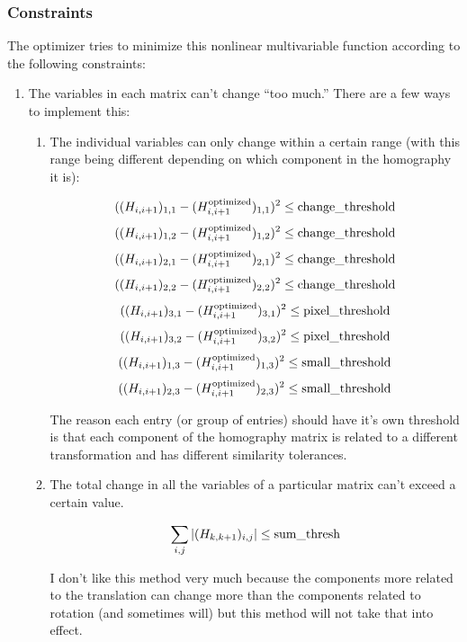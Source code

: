 \documentclass{article}
\begin{document}
\subsubsection{Constraints}

The optimizer tries to minimize this nonlinear multivariable function according
to the following constraints:

\begin{enumerate}

\item The variables in each matrix can't change ``too much.'' There are a few
ways to implement this:

\begin{enumerate}

\item \label{indiv_thresh} The individual variables can only change within a certain range (with
this range being different depending on which component in the homography it
is):

\[((H_{i, i+1})_{1, 1} - (H_{i, i+1}^{\textnormal{optimized}})_{1, 1})^2 \leq \textnormal{change\_threshold}\] 
\[((H_{i, i+1})_{1, 2} - (H_{i, i+1}^{\textnormal{optimized}})_{1, 2})^2 \leq \textnormal{change\_threshold}\] 
\[((H_{i, i+1})_{2, 1} - (H_{i, i+1}^{\textnormal{optimized}})_{2, 1})^2 \leq \textnormal{change\_threshold}\] 
\[((H_{i, i+1})_{2, 2} - (H_{i, i+1}^{\textnormal{optimized}})_{2, 2})^2 \leq \textnormal{change\_threshold}\] 
\[((H_{i, i+1})_{3, 1} - (H_{i, i+1}^{\textnormal{optimized}})_{3, 1})^2 \leq \textnormal{pixel\_threshold}\] 
\[((H_{i, i+1})_{3, 2} - (H_{i, i+1}^{\textnormal{optimized}})_{3, 2})^2 \leq \textnormal{pixel\_threshold}\] 
\[((H_{i, i+1})_{1, 3} - (H_{i, i+1}^{\textnormal{optimized}})_{1, 3})^2 \leq \textnormal{small\_threshold}\] 
\[((H_{i, i+1})_{2, 3} - (H_{i, i+1}^{\textnormal{optimized}})_{2, 3})^2 \leq \textnormal{small\_threshold}\] 

The reason each entry (or group of entries) should have it's own threshold is
that each component of the homography matrix is related to a different
transformation and has different similarity tolerances. 

\item The total change in all the variables of a particular matrix can't exceed a certain value.

\[\sum_{i, j} |(H_{k, k+1})_{i, j}| \leq \textnormal{sum\_thresh}\]

I don't like this method very much because the components more related to the
translation can change more than the components related to rotation (and
sometimes will) but this method will not take that into effect. 


\end{enumerate}
\end{enumerate}
\end{document}
